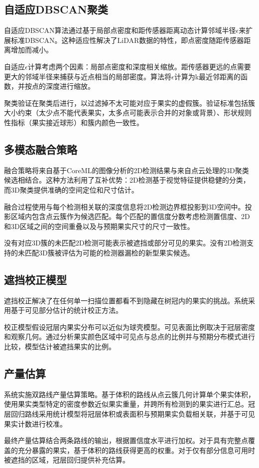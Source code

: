 \subsection{自适应DBSCAN聚类}
自适应DBSCAN算法通过基于局部点密度和距传感器距离动态计算邻域半径$\epsilon$来扩展标准DBSCAN。这种适应性解决了LiDAR数据的特性，即点密度随距传感器距离增加而减小。

自适应$\epsilon$计算考虑两个因素：局部点密度和深度相关缩放。距传感器更远的点需要更大的邻域半径来捕获与近点相当的局部密度。算法将$\epsilon$计算为k最近邻距离的函数，并按点的深度进行缩放。

聚类验证在聚类后进行，以过滤掉不太可能对应于果实的虚假簇。验证标准包括簇大小约束（太少点不能代表果实，太多点可能表示合并的对象或背景）、形状规则性指标（果实接近球形）和簇内颜色一致性。

\subsection{多模态融合策略}
融合策略将来自基于CoreML的图像分析的2D检测结果与来自点云处理的3D聚类候选相结合。这种方法利用了互补优势：2D检测基于视觉特征提供稳健的分类，而3D聚类提供准确的空间定位和尺寸估计。

融合过程使用与每个检测相关联的深度信息将2D检测边界框投影到3D空间中。投影区域内包含点云簇作为候选匹配。每个匹配的置信度分数考虑检测置信度、2D和3D区域之间的空间重叠以及与预期果实尺寸的尺寸一致性。

没有对应3D簇的未匹配2D检测可能表示被遮挡或部分可见的果实。没有2D检测支持的未匹配3D簇被评估为可能的检测器漏检的新型果实候选。

\subsection{遮挡校正模型}
遮挡校正解决了在任何单一扫描位置都看不到隐藏在树冠内的果实的挑战。系统采用基于可见部分估计的统计校正方法。

校正模型假设冠层内果实分布可以近似为球壳模型。可见表面比例取决于冠层密度和观察几何。通过分析果实颜色区域中可见点与总点的比例并与预期分布模式进行比较，模型估计被遮挡果实的比例。

\subsection{产量估算}
系统实施双路线产量估算策略。基于体积的路线从点云簇几何计算单个果实体积，使用果实类型特定的密度参数近似果实重量，并跨所有检测到的果实进行汇总。冠层回归路线采用统计模型将冠层体积或表面积与预期果实负载相关联，并基于可见果实计数进行校准。

最终产量估算结合两条路线的输出，根据置信度水平进行加权。对于具有完整点覆盖的充分暴露的果实，基于体积的路线获得更高的权重。对于仅有部分信息可用时被遮挡的区域，冠层回归提供补充估算。